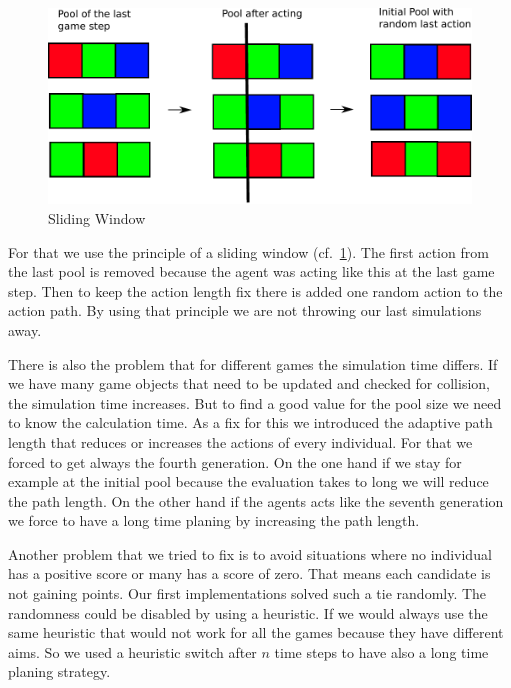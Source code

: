 \begin{figure}[H]
\centering
\includegraphics[scale=0.6]{images/sliding_window.pdf}
\caption{Sliding Window}
\label{fig:sliding_window}
\end{figure}

For that we use the principle of a sliding window (cf.~\cref{fig:sliding_window}). The first
action from the last pool is removed because the agent was acting like this at the last game step. Then
to keep the action length fix there is added one random action to the action path.
By using that principle we are not throwing our last simulations away.

There is also the problem that for different games the simulation time differs. If we have many game objects that 
need to be updated and checked for collision, the simulation time increases.
But to find a good value for the pool size we need to know the calculation time.
As a fix for this we introduced the adaptive path length that reduces or increases the actions
of every individual.
For that we forced to get always the fourth generation. On the one hand if we stay for example at the initial
pool because the evaluation takes to long we will reduce the path length. On the other hand if the agents acts like 
the seventh generation we force to have a long time planing by increasing the path length.

Another problem that we tried to fix is to avoid situations where no individual has a positive score or many has a score of zero. That means each 
candidate is not gaining points. Our first implementations solved such a tie randomly. 
The randomness could be disabled by using a heuristic. If we would always use the same heuristic that would not work
for all the games because they have different aims. 
So we used a heuristic switch after $n$ time steps to have also a long time planing strategy.


  
  
